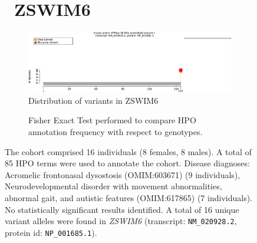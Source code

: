 \begin{figure}[htbp]
\section*{ ZSWIM6}
\centering
\begin{subfigure}[b]{0.95\textwidth}
\centering
\includegraphics[width=\textwidth]{ img/ZSWIM6_protein_diagram.pdf} 
\captionsetup{justification=raggedright,singlelinecheck=false}
\caption{Distribution of variants in ZSWIM6}
\end{subfigure}

\vspace{2em}

\begin{subfigure}[b]{0.95\textwidth}
\centering
{}
\captionsetup{justification=raggedright,singlelinecheck=false}
\caption{Fisher Exact Test performed to compare HPO annotation frequency with respect to genotypes.}
\end{subfigure}

\vspace{2em}

\caption{The cohort comprised 16 individuals (8 females, 8 males). A total of 85 HPO terms were used to annotate the cohort. 
Disease diagnoses: Acromelic frontonasal dysostosis (OMIM:603671) (9 individuals), 
Neurodevelopmental disorder with movement abnormalities, abnormal gait, and autistic features (OMIM:617865) (7 individuals). 
No statistically significant results identified. A total of 16 unique variant alleles were found in \textit{ZSWIM6} 
(transcript: \texttt{NM\_020928.2}, protein id: \texttt{NP\_001685.1}).}
\end{figure}
